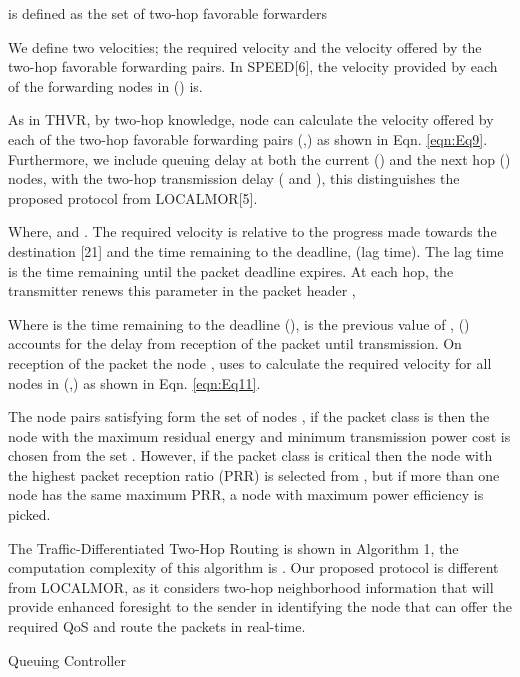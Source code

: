 \documentclass[fleqn,twoside]{article}
\begin{document}
 is defined as the set of two-hop favorable forwarders 

We define two velocities; the required velocity  and the velocity offered by the two-hop favorable forwarding pairs. In SPEED[6], the velocity provided by each of the forwarding nodes in () is.

As in THVR\cite{ERTD2HI}, by two-hop knowledge, node  can calculate the velocity offered by each of the two-hop favorable forwarding pairs (,) as shown in Eqn. \ref{eqn:Eq9}. Furthermore, we include queuing delay at both the current () and the next hop () nodes, with the two-hop transmission delay ( and ), this distinguishes the proposed protocol
from LOCALMOR[5].

Where,  and . The required velocity is relative to the progress made towards the destination
[21] and the time remaining to the deadline,  (lag time). The lag time is the time remaining until the packet deadline expires. At each hop, the transmitter renews this parameter in the packet header ,

Where  is the time remaining to the deadline (),  is the previous value 
of , () accounts for the delay 
from reception of the packet until transmission. On reception of the packet the node , uses  to calculate the 
required velocity  for all nodes in (,) as shown in Eqn. \ref{eqn:Eq11}.

The node pairs satisfying  form the set of nodes , if the packet class
is  then the node with the maximum residual energy and minimum transmission power cost is chosen from the
set . However, if the packet class is critical then the node with the highest packet reception ratio (PRR) is
selected from , but if more than one node has the same maximum PRR, a node with maximum power efficiency is picked.

The Traffic-Differentiated Two-Hop Routing is shown in Algorithm 1, the computation complexity of this 
algorithm is . Our proposed protocol is different from LOCALMOR, as it considers
two-hop neighborhood information that will provide enhanced foresight to the sender in identifying the node that can 
offer the required QoS and route the packets in real-time.

\begin{algorithm}
\begin{footnotesize}
\KwIn{, }
\BlankLine
{}
\caption{Queuing Controller}
\label{algo:qm}
\end{footnotesize}
\end{algorithm}
\end{document}
